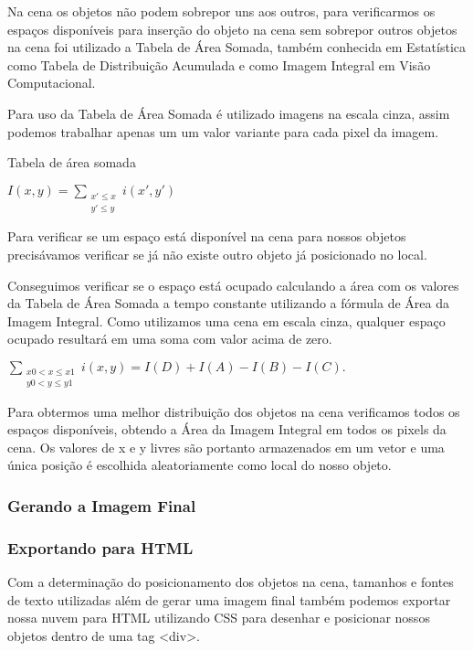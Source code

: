 \documentclass[12pt]{article}
\begin{document}
Na cena os objetos não podem sobrepor uns aos outros, para verificarmos os espaços disponíveis para inserção do objeto na cena sem sobrepor outros objetos na cena foi utilizado a Tabela de Área Somada, também conhecida em Estatística como Tabela de Distribuição Acumulada e como Imagem Integral em Visão Computacional.

Para uso da Tabela de Área Somada é utilizado imagens na escala cinza, assim podemos trabalhar apenas um um valor variante para cada pixel da imagem. 

Tabela de área somada


$I(x,y) = \sum_{\begin{smallmatrix} x' \le x \\ y' \le y\end{smallmatrix}} i(x',y')$

Para verificar se um espaço está disponível na cena para nossos objetos precisávamos verificar se já não existe outro objeto já posicionado no local. 

Conseguimos verificar se o espaço está ocupado calculando a área com os valores da Tabela de Área Somada a tempo constante utilizando a fórmula de Área da Imagem Integral. Como utilizamos uma cena em escala cinza, qualquer espaço ocupado resultará em uma soma com valor acima de zero.  

$\sum_{\begin{smallmatrix} x0 < x \le x1 \\ y0 < y \le y1 \end{smallmatrix}} i(x,y) = I(D) + I(A) - I(B) - I(C).$

Para obtermos uma melhor distribuição dos objetos na cena verificamos todos os espaços disponíveis, obtendo a Área da Imagem Integral em todos os pixels da cena. Os valores de x e y livres são portanto armazenados em um vetor e uma única posição é escolhida aleatoriamente como local do nosso objeto. 


\subsubsection{Gerando a Imagem Final}


\subsubsection{Exportando para HTML}

Com a determinação do posicionamento dos objetos na cena, tamanhos e fontes de texto utilizadas além de gerar uma imagem final também podemos exportar nossa nuvem para HTML utilizando CSS para desenhar e posicionar nossos objetos dentro de uma tag <div>.
\end{document}
